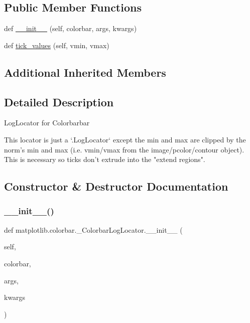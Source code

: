 \subsection*{Public Member Functions}
\begin{DoxyCompactItemize}
\item 
def \hyperlink{classmatplotlib_1_1colorbar_1_1__ColorbarLogLocator_a4cb0f629a15e29b2771bef262dfbf094}{\+\_\+\+\_\+init\+\_\+\+\_\+} (self, colorbar, args, kwargs)
\item 
def \hyperlink{classmatplotlib_1_1colorbar_1_1__ColorbarLogLocator_a6754d2784893876b51cfc96648ae359f}{tick\+\_\+values} (self, vmin, vmax)
\end{DoxyCompactItemize}
\subsection*{Additional Inherited Members}


\subsection{Detailed Description}
\begin{DoxyVerb}LogLocator for Colorbarbar

This locator is just a `.LogLocator` except the min and max are
clipped by the norm's min and max (i.e. vmin/vmax from the
image/pcolor/contour object).  This is necessary so ticks don't
extrude into the "extend regions".\end{DoxyVerb}
 

\subsection{Constructor \& Destructor Documentation}
\mbox{\label{classmatplotlib_1_1colorbar_1_1__ColorbarLogLocator_a4cb0f629a15e29b2771bef262dfbf094}} 
\subsubsection{\texorpdfstring{\+\_\+\+\_\+init\+\_\+\+\_\+()}{\_\_init\_\_()}}
{\footnotesize\ttfamily def matplotlib.\+colorbar.\+\_\+\+Colorbar\+Log\+Locator.\+\_\+\+\_\+init\+\_\+\+\_\+ (\begin{DoxyParamCaption}\item[{}]{self,  }\item[{}]{colorbar,  }\item[{}]{args,  }\item[{}]{kwargs }\end{DoxyParamCaption})}

